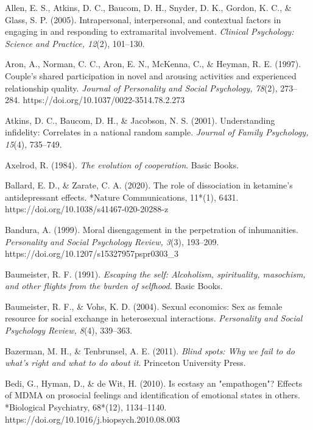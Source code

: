 \begin{thebibliography}{}

    Allen, E. S., Atkins, D. C., Baucom, D. H., Snyder, D. K., Gordon, K. C., \& Glass, S. P. (2005). Intrapersonal, interpersonal, and contextual factors in engaging in and responding to extramarital involvement. \textit{Clinical Psychology: Science and Practice, 12}(2), 101–130.

    Aron, A., Norman, C. C., Aron, E. N., McKenna, C., \& Heyman, R. E. (1997). Couple's shared participation in novel and arousing activities and experienced relationship quality. \textit{Journal of Personality and Social Psychology, 78}(2), 273--284. https://doi.org/10.1037/0022-3514.78.2.273
    
    Atkins, D. C., Baucom, D. H., \& Jacobson, N. S. (2001). Understanding infidelity: Correlates in a national random sample. \textit{Journal of Family Psychology, 15}(4), 735–749.

    Axelrod, R. (1984). \textit{The evolution of cooperation}. Basic Books.

    Ballard, E. D., \& Zarate, C. A. (2020). The role of dissociation in ketamine’s antidepressant effects. *Nature Communications, 11*(1), 6431. https://doi.org/10.1038/s41467-020-20288-z

    Bandura, A. (1999). Moral disengagement in the perpetration of inhumanities. \textit{Personality and Social Psychology Review, 3}(3), 193–209. https://doi.org/10.1207/s15327957pspr0303\_3

    Baumeister, R. F. (1991). \textit{Escaping the self: Alcoholism, spirituality, masochism, and other flights from the burden of selfhood}. Basic Books.
    
    Baumeister, R. F., \& Vohs, K. D. (2004). Sexual economics: Sex as female resource for social exchange in heterosexual interactions. \textit{Personality and Social Psychology Review, 8}(4), 339–363.
    
    Bazerman, M. H., \& Tenbrunsel, A. E. (2011). \textit{Blind spots: Why we fail to do what's right and what to do about it}. Princeton University Press.

    Bedi, G., Hyman, D., \& de Wit, H. (2010). Is ecstasy an "empathogen"? Effects of MDMA on prosocial feelings and identification of emotional states in others. *Biological Psychiatry, 68*(12), 1134–1140. https://doi.org/10.1016/j.biopsych.2010.08.003
    

\end{thebibliography}
